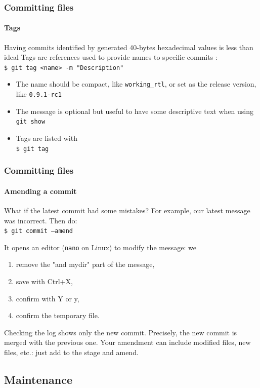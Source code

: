 \begin{frame}
\frametitle{Committing files}
\framesubtitle{Tags}

\begin{block}{Having commits identified by generated 40-bytes hexadecimal values is less than ideal}
Tags are references used to provide names to specific commits : \\
\texttt{\$ git tag <name> -m "Description"} \\

\medskip
\begin{itemize}
\item The name should be compact, like \texttt{working\_rtl}, or set as the release version, like \texttt{0.9.1-rc1}
\item The message is optional but useful to have some descriptive text when using \texttt{git show}
\item Tags are listed with \\
\texttt{\$ git tag}
\end{itemize}
\end{block}
\end{frame}

\begin{frame}
\frametitle{Committing files}
\framesubtitle{Amending a commit}

\begin{block}{What if the latest commit had some mistakes?}
For example, our latest message was incorrect. Then do: \\
\texttt{\$ git commit ---amend}

\smallskip
It opens an editor (\texttt{nano} on Linux) to modify the message: we 

\begin{enumerate}
\item remove the "and mydir" part of the message,
\item save with Ctrl+X,
\item confirm with Y or y,
\item confirm the temporary file.
\end{enumerate}

Checking the log shows only the new commit. Precisely, the new commit is merged with the previous one. Your amendment can include modified files, new files, etc.: just add to the stage and amend.
\end{block}
\end{frame}

\subsection{Maintenance}

